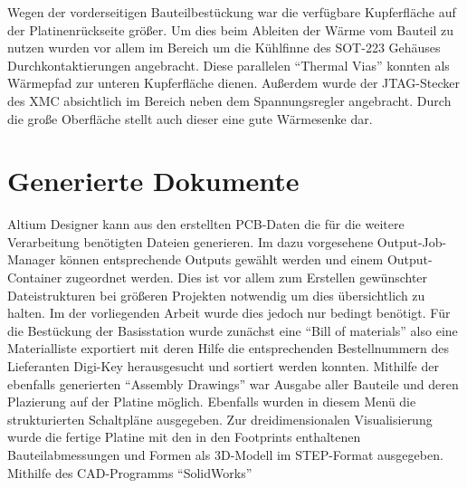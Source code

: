 Wegen der vorderseitigen Bauteilbestückung war die verfügbare Kupferfläche auf der Platinenrückseite  größer. Um dies beim Ableiten der Wärme vom Bauteil zu nutzen wurden vor allem im Bereich um die Kühlfinne des \ac{SOT}-223 Gehäuses Durchkontaktierungen angebracht. Diese parallelen \enquote{Thermal Vias} konnten als Wärmepfad zur unteren Kupferfläche dienen. Außerdem wurde der \ac{JTAG}-Stecker des XMC absichtlich im Bereich neben dem Spannungsregler angebracht. Durch die große Oberfläche stellt auch dieser eine gute Wärmesenke dar. %

\section{Generierte Dokumente}
Altium Designer kann aus den erstellten \ac{PCB}-Daten die für die weitere Verarbeitung benötigten Dateien generieren. Im dazu vorgesehene Output-Job-Manager können entsprechende Outputs gewählt werden und einem Output-Container zugeordnet werden. Dies ist vor allem zum Erstellen gewünschter Dateistrukturen bei größeren Projekten notwendig um dies übersichtlich zu halten. Im der vorliegenden Arbeit wurde dies jedoch nur bedingt benötigt.
Für die Bestückung der Basisstation wurde zunächst eine \enquote{Bill of materials} also eine Materialliste exportiert mit deren Hilfe die entsprechenden Bestellnummern des Lieferanten Digi-Key herausgesucht und sortiert werden konnten. Mithilfe der ebenfalls generierten \enquote{Assembly Drawings} war Ausgabe aller Bauteile und deren Plazierung auf der Platine möglich. Ebenfalls wurden in diesem Menü die strukturierten Schaltpläne ausgegeben.
Zur dreidimensionalen Visualisierung wurde die fertige Platine mit den in den Footprints enthaltenen Bauteilabmessungen und Formen als 3D-Modell im \ac{STEP}-Format ausgegeben. Mithilfe des \ac{CAD}-Programms \enquote{SolidWorks} 



